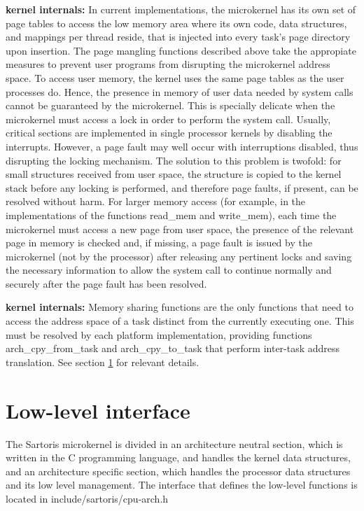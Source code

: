 \documentclass[11pt, letterpaper, twoside, english]{book}
\begin{document}
\textbf{kernel internals:} In current implementations, the microkernel has its own set of page tables to access the low memory area where its own code, data structures, and mappings per thread reside, that is injected into every task's page directory upon insertion. The page mangling functions described above take the appropiate measures to prevent user programs from disrupting the microkernel address space. To access user memory, the kernel uses the same page tables as the user processes do. Hence, the presence in memory of user data needed by system calls cannot be guaranteed by the microkernel. This is specially delicate when the microkernel must access a lock in order to perform the system call. Usually, critical sections are implemented in single processor kernels by disabling the interrupts. However, a page fault may well occur with interruptions disabled, thus disrupting the locking mechanism. The solution to this problem is twofold: for small structures received from user space, the structure is copied to the kernel stack before any locking is performed, and therefore page faults, if present, can be resolved without harm. For larger memory access (for example, in the implementations of the functions \textsf{read\_mem} and \textsf{write\_mem}), each time the microkernel must access a new page from user space, the presence of the relevant page in memory is checked and, if missing, a page fault is issued by the microkernel (not by the processor) after releasing any pertinent locks and saving the necessary information to allow the system call to continue normally and securely after the page fault has been resolved.

\textbf{kernel internals:} Memory sharing functions are the only functions that need to access the address space of a task distinct from the currently executing one. This must be resolved by each platform implementation, providing functions \textsf{arch\_cpy\_from\_task} and \textsf{arch\_cpy\_to\_task} that perform inter-task address translation. See section \ref{sec:lowlevelinterface} for relevant details.

\section{Low-level interface} \label{sec:lowlevelinterface}

The Sartoris microkernel is divided in an architecture neutral section, which is written in the C programming language, and handles the kernel data structures, and an architecture specific section, which handles the processor data structures and its low level management. The interface that defines the low-level functions is located in \textsf{include/sartoris/cpu-arch.h}
\end{document}
